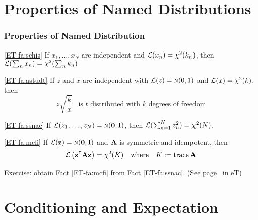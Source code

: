 \section{Properties of Named Distributions}

\begin{frame}\frametitle{Properties of Named Distribution}

    \vspace{2em}
    \Fact
    \eqref{ET-fa:schis}
    If $x_1,\ldots,x_N$ are independent and $\mathcal L(x_n) = \chi^2(k_n)$,
     then $\mathcal L(\sum_n x_n) = \chi^2(\sum_n k_n)$
    
    \vspace{2em}
    \Fact
    \eqref{ET-fa:astudt}
    If $z$ and $x$ are independent with $\mathcal L(z) = \textrm{\sc n}(0,1)$ and $\mathcal L(x) = \chi^2(k)$, 
    then 
    \begin{equation*}
        z \sqrt{\frac{k}{x} } 
        \;\;
        \text{ is $t$ distributed with $k$ degrees of freedom}
    \end{equation*}
    

\end{frame}

\begin{frame}

    \vspace{2em}
    \Fact
    \eqref{ET-fa:ssnac}
    If $\mathcal L(z_1, \ldots, z_N) = \textrm{\sc n}({\mathbf 0}, \mathbf I)$, then
    $\mathcal L(\sum_{n=1}^N z_n^2) = \chi^2(N)$. 
    
    \vspace{2em}
    \Fact
    \eqref{ET-fa:mcfi}
    If $\mathcal L({\mathbf z}) = \textrm{\sc n}({\mathbf 0}, \mathbf I)$ and $\mathbf A$ is symmetric and
    idempotent, then 
    \begin{equation*}
        \lL \left( \boldz^\T \boldA \boldz \right) = \chi^2(K)  
        \quad \text{where} \quad
        K := \trace \boldA
    \end{equation*}
    
    \vspace{1em}
    Exercise: obtain Fact \eqref{ET-fa:mcfi} from Fact \eqref{ET-fa:ssnac}.
    (See page~\pageref{ET-fa:mcfi} in eT)
    
\end{frame}

\section{Conditioning and Expectation}

